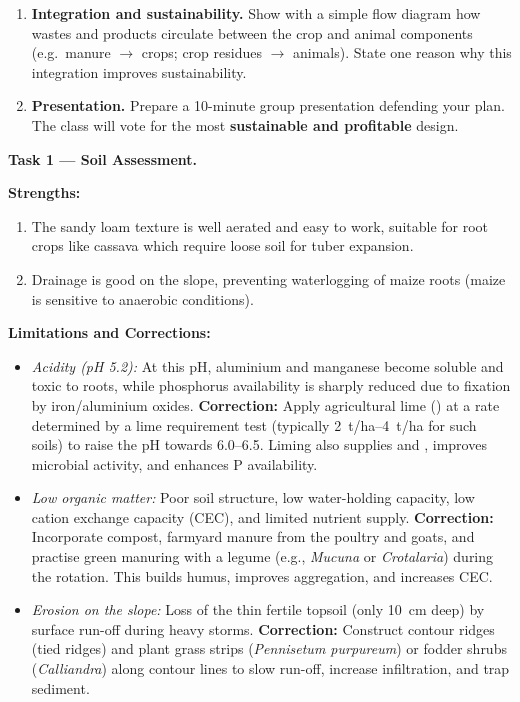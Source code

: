 \documentclass[11pt]{article}
\newcommand{\cle}[1]{{\popxbold\color{popdark}#1}}
\newcounter{popsec}
\newcounter{popsub}
\newcommand{\courssub}[1]{%
  \stepcounter{popsub}%
  \par\vspace{9pt}\noindent{\popxbold\fontsize{11.5}{13}\selectfont\color{popink}{\color{poporange}\thepopsec.\thepopsub}\hspace{6pt}#1}\par\nopagebreak\vspace{4pt}
}
\begin{document}
\begin{enumerate}
\item \textbf{Integration and sustainability.} Show with a simple flow diagram how wastes and products circulate between the crop and animal components (e.g.\ manure $\rightarrow$ crops; crop residues $\rightarrow$ animals). State one reason why this integration improves sustainability.

\item \textbf{Presentation.} Prepare a 10-minute group presentation defending your plan. The class will vote for the most \textbf{sustainable and profitable} design.
\end{enumerate}

\courssub{Model Answers}

\textbf{Task 1 — Soil Assessment.}\par
\textbf{Strengths:}
\begin{enumerate}
\item The sandy loam texture is \cle{well aerated} and easy to work, suitable for root crops like cassava which require loose soil for tuber expansion.
\item Drainage is good on the slope, preventing waterlogging of maize roots (maize is sensitive to anaerobic conditions).
\end{enumerate}

\textbf{Limitations and Corrections:}
\begin{itemize}
\item \emph{Acidity (pH 5.2):} At this pH, aluminium and manganese become soluble and toxic to roots, while phosphorus availability is sharply reduced due to fixation by iron/aluminium oxides. \textbf{Correction:} Apply agricultural lime () at a rate determined by a lime requirement test (typically \SIrange{2}{4}{t/ha} for such soils) to raise the pH towards 6.0--6.5. Liming also supplies  and , improves microbial activity, and enhances P availability.
\item \emph{Low organic matter:} Poor soil structure, low water-holding capacity, low cation exchange capacity (CEC), and limited nutrient supply. \textbf{Correction:} Incorporate compost, farmyard manure from the poultry and goats, and practise green manuring with a legume (e.g., \emph{Mucuna} or \emph{Crotalaria}) during the rotation. This builds humus, improves aggregation, and increases CEC.
\item \emph{Erosion on the slope:} Loss of the thin fertile topsoil (only \SI{10}{cm} deep) by surface run-off during heavy storms. \textbf{Correction:} Construct contour ridges (tied ridges) and plant grass strips (\emph{Pennisetum purpureum}) or fodder shrubs (\emph{Calliandra}) along contour lines to slow run-off, increase infiltration, and trap sediment.
\end{itemize}
\end{document}
